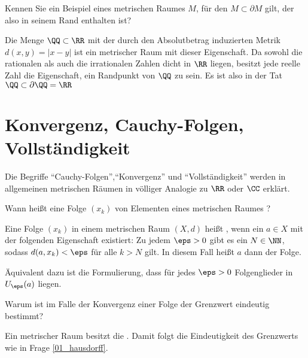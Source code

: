 \begin{frage}
  Kennen Sie ein Beispiel eines metrischen Raumes $M$, für den 
  $M\subset \partial M$ gilt, der also in seinem Rand enthalten ist?
\end{frage}

\begin{antwort}
  Die Menge $\QQ \subset \RR$ mit der durch den Absolutbetrag induzierten 
  Metrik $d(x,y)=|x-y|$ ist {\zB} 
  ein metrischer Raum mit dieser Eigenschaft. Da sowohl die 
  rationalen als auch die irrationalen Zahlen dicht in $\RR$ liegen, besitzt 
  jede reelle Zahl die Eigenschaft, ein Randpunkt von $\QQ$ zu sein. 
  Es ist also in der Tat $\QQ \subset \partial \QQ = \RR$   
  \AntEnd 
\end{antwort} 





\section{Konvergenz, Cauchy-Folgen, Vollständigkeit}

Die Begriffe "`Cauchy-Folgen"',"`Konvergenz"' und "`Vollständigkeit"' 
werden in allgemeinen metrischen Räumen in völliger Analogie zu 
$\RR$ oder $\CC$ erklärt.  

\begin{frage}
  Wann heißt eine Folge $(x_k)$ von Elementen eines metrischen Raumes 
  ?
\end{frage}

\begin{antwort}
  Eine Folge $(x_k)$ in einem metrischen Raum $(X,d)$ 
  heißt , wenn ein 
  $a\in X$ mit der folgenden Eigenschaft existiert: 
  Zu jedem $\eps>0$ gibt es ein $N\in \NN$, sodass $d(a,x_k)< \eps$ 
  für alle $k>N$ gilt. In diesem Fall heißt $a$ dann 
  der  Folge. 

  Äquivalent dazu ist die Formulierung, dass für jedes $\eps>0$ 
   Folgenglieder in $U_\eps(a)$ liegen.  
  \AntEnd
\end{antwort}

\begin{frage}
  Warum ist im Falle der Konvergenz einer Folge der Grenzwert eindeutig 
  bestimmt?
\end{frage}

\begin{antwort}
  Ein metrischer Raum besitzt 
  die . Damit folgt 
  die Eindeutigkeit des Grenzwerts wie in Frage \ref{01_hausdorff}.
  \AntEnd
\end{antwort}

